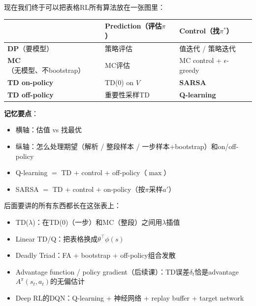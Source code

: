 \documentclass[11pt,a4paper]{article}
\theoremstyle{definition}
\begin{document}
\begin{plainwords}
现在我们终于可以把表格RL所有算法放在一张图里：

\begin{center}
\begin{tabular}{l|l|l}
\toprule
& \textbf{Prediction（评估$\pi$）} & \textbf{Control（找$\pi^*$）} \\
\midrule
\textbf{DP}（要模型） & 策略评估 & 值迭代 / 策略迭代 \\
\textbf{MC}（无模型、不bootstrap） & MC评估 & MC control + $\epsilon$-greedy \\
\textbf{TD on-policy} & TD(0) on $V$ & \textbf{SARSA} \\
\textbf{TD off-policy} & 重要性采样TD & \textbf{Q-learning} \\
\bottomrule
\end{tabular}
\end{center}

\textbf{记忆要点}：
\begin{itemize}
\item 横轴：估值 vs 找最优
\item 纵轴：怎么处理期望（解析 / 整段样本 / 一步样本+bootstrap）和on/off-policy
\item Q-learning $=$ TD $+$ control $+$ off-policy（$\max$）
\item SARSA $=$ TD $+$ control $+$ on-policy（按$\pi$采样$a'$）
\end{itemize}

后面要讲的所有东西都长在这张表上：
\begin{itemize}
\item TD($\lambda$)：在TD(0)（一步）和MC（整段）之间用$\lambda$插值
\item Linear TD/Q：把表格换成$\theta^\top\phi(s)$
\item Deadly Triad：FA + bootstrap + off-policy组合发散
\item Advantage function / policy gradient（后续课）：TD误差$\delta_t$恰是advantage $A^\pi(s_t,a_t)$的无偏估计
\item Deep RL的DQN：Q-learning + 神经网络 + replay buffer + target network
\end{itemize}
\end{plainwords}
\end{document}
